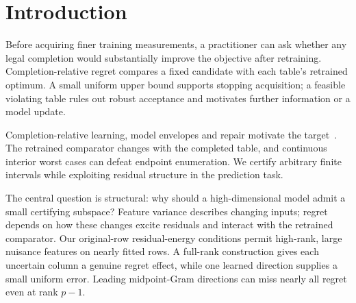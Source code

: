 \begin{abstract}
We certify a fixed ridge predictor's regret against full-feature retraining over every continuous completion of an interval-valued table. Our main theorem gives verifiable original-row residual conditions for a uniform error bound independent of nuisance-feature scale and rank, with an asymptotically sharp leading constant and quantitative leakage stability. Full-rank constructions separate certification dimension from feature dimension, including examples requiring directions beyond the candidate. Observed-row anchors make the conditions computable, while exact row geometry and global search return valid upper bounds and feasible original-table witnesses. A finite-scale contraction and common-domain moment fallback implement the structural result. Four real-world tasks retain all model features and certify twenty rank-three instances to width $10^{-5}$. Their primary median widths improve over centered moments. Joint residual refinement additionally certifies all twenty new response-independent masks to the same precision within 76.21 seconds. For a concrete fixed-point predictor contract, pure energy certifies thirteen of fifteen stopping decisions in ten seconds, versus five for moments. Refinement certifies all fifteen within 91.68 seconds at the same objective threshold.
\end{abstract}

\section{Introduction}
Before acquiring finer training measurements, a practitioner can ask whether any legal completion would substantially improve the objective after retraining. Completion-relative regret compares a fixed candidate with each table's retrained optimum. A small uniform upper bound supports stopping acquisition; a feasible violating table rules out robust acceptance and motivates further information or a model update.

Completion-relative learning, model envelopes and repair motivate the target~\citep{zhen2024sigmod,zhu2024zorro,repair2026,vanli2014}. The retrained comparator changes with the completed table, and continuous interior worst cases can defeat endpoint enumeration. We certify arbitrary finite intervals while exploiting residual structure in the prediction task.

The central question is structural: why should a high-dimensional model admit a small certifying subspace? Feature variance describes changing inputs; regret depends on how these changes excite residuals and interact with the retrained comparator. Our original-row residual-energy conditions permit high-rank, large nuisance features on nearly fitted rows. A full-rank construction gives each uncertain column a genuine regret effect, while one learned direction supplies a small uniform error. Leading midpoint-Gram directions can miss nearly all regret even at rank $p-1$.

